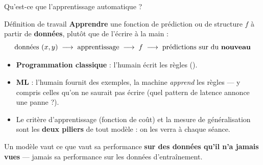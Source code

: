 \begin{frame}{Qu'est-ce que l'apprentissage automatique ?}
\begin{block}{Définition de travail}
\textbf{Apprendre} une fonction de prédiction ou de structure
$f$ à partir de \textbf{données}, plutôt que de l'écrire à la main :
\[
\text{données } (x, y) \;\longrightarrow\; \text{apprentissage}
\;\longrightarrow\; f \;\longrightarrow\; \text{prédictions sur du \textbf{nouveau}}
\]
\end{block}
\begin{itemize}
\item \textbf{Programmation classique} : l'humain écrit les règles
().
\item \textbf{ML} : l'humain fournit des exemples, la machine \emph{apprend} les règles
--- y compris celles qu'on ne saurait pas écrire (quel pattern de latence annonce une panne ?).
\item Le critère d'apprentissage (fonction de coût) et la mesure de généralisation
sont les \textbf{deux piliers} de tout modèle : on les verra à chaque séance.
\end{itemize}
\begin{kbox}
Un modèle vaut ce que vaut sa performance \textbf{sur des données qu'il n'a jamais vues}
--- jamais sa performance sur les données d'entraînement.
\end{kbox}
\end{frame}

